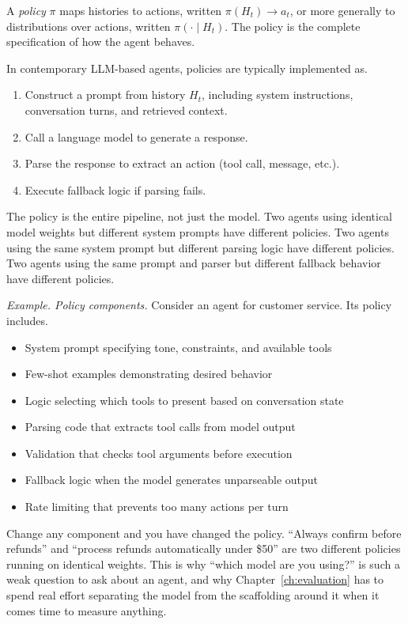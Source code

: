 A \emph{policy} $\pi$ maps histories to actions, written $\pi(H_t) \rightarrow a_t$, or more generally to distributions over actions, written $\pi(\cdot \mid H_t)$. The policy is the complete specification of how the agent behaves.

In contemporary LLM-based agents, policies are typically implemented as.

\begin{enumerate}
\item Construct a prompt from history $H_t$, including system instructions, conversation turns, and retrieved context.
\item Call a language model to generate a response.
\item Parse the response to extract an action (tool call, message, etc.).
\item Execute fallback logic if parsing fails.
\end{enumerate}

The policy is the entire pipeline, not just the model. Two agents using identical model weights but different system prompts have different policies. Two agents using the same system prompt but different parsing logic have different policies. Two agents using the same prompt and parser but different fallback behavior have different policies.

\textit{Example. Policy components.} Consider an agent for customer service. Its policy includes.

\begin{itemize}
\item System prompt specifying tone, constraints, and available tools
\item Few-shot examples demonstrating desired behavior
\item Logic selecting which tools to present based on conversation state
\item Parsing code that extracts tool calls from model output
\item Validation that checks tool arguments before execution
\item Fallback logic when the model generates unparseable output
\item Rate limiting that prevents too many actions per turn
\end{itemize}

Change any component and you have changed the policy. ``Always confirm before refunds'' and ``process refunds automatically under \$50'' are two different policies running on identical weights. This is why ``which model are you using?'' is such a weak question to ask about an agent, and why Chapter~\ref{ch:evaluation} has to spend real effort separating the model from the scaffolding around it when it comes time to measure anything.

